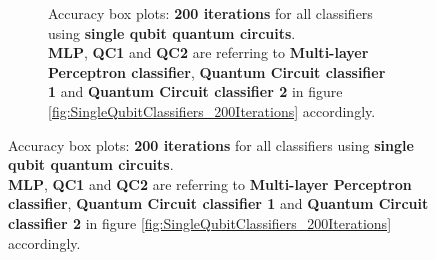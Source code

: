 \begin{figure}[h!]
\begin{subfigure}{1.0\textwidth}
\begin{subfigure}{1.0\textwidth}
{            }
        \end{subfigure}
        \begin{subfigure}{1.0\textwidth}
            \centering
        \end{subfigure}
        \begin{subfigure}{1.0\textwidth}
            \centering
        \end{subfigure}
        \caption{Accuracy box plots: \textbf{200 iterations} for all classifiers using \textbf{single qubit quantum circuits}.\\ \textbf{MLP}, \textbf{QC1} and \textbf{QC2} are referring to \textbf{Multi-layer Perceptron classifier}, \textbf{Quantum Circuit classifier 1} and \textbf{Quantum Circuit classifier 2} in figure \ref{fig:SingleQubitClassifiers_200Iterations} accordingly.}
        \label{fig:SingleQubitClassifiers_200Iterations_boxplot}
    \end{subfigure}
\end{figure}

